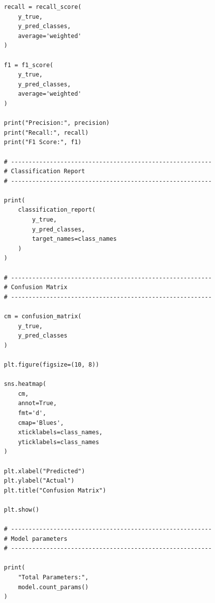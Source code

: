 \documentclass[12pt,a4paper]{article}
\begin{document}
\begin{lstlisting}
recall = recall_score(
    y_true,
    y_pred_classes,
    average='weighted'
)

f1 = f1_score(
    y_true,
    y_pred_classes,
    average='weighted'
)

print("Precision:", precision)
print("Recall:", recall)
print("F1 Score:", f1)

# ---------------------------------------------------------
# Classification Report
# ---------------------------------------------------------

print(
    classification_report(
        y_true,
        y_pred_classes,
        target_names=class_names
    )
)

# ---------------------------------------------------------
# Confusion Matrix
# ---------------------------------------------------------

cm = confusion_matrix(
    y_true,
    y_pred_classes
)

plt.figure(figsize=(10, 8))

sns.heatmap(
    cm,
    annot=True,
    fmt='d',
    cmap='Blues',
    xticklabels=class_names,
    yticklabels=class_names
)

plt.xlabel("Predicted")
plt.ylabel("Actual")
plt.title("Confusion Matrix")

plt.show()

# ---------------------------------------------------------
# Model parameters
# ---------------------------------------------------------

print(
    "Total Parameters:",
    model.count_params()
)
\end{lstlisting}
\end{document}
